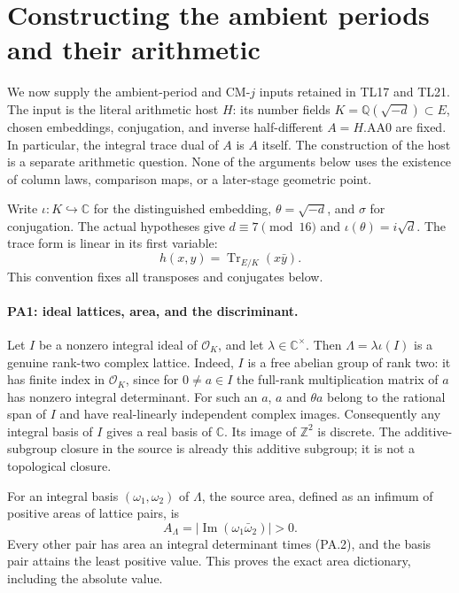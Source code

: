 \section{Constructing the ambient periods and their arithmetic}
\label{sec:period-arithmetic}

We now supply the ambient-period and CM-$j$ inputs retained in TL17
and TL21. The input is the literal arithmetic host $H$: its number
fields $K=\mathbb Q(\sqrt{-d})\subset E$, chosen embeddings, conjugation,
and inverse half-different $A=H.\mathrm{AA0}$ are fixed. In particular,
the integral trace dual of $A$ is $A$ itself. The construction of the
host is a separate arithmetic question. None of the arguments below
uses the existence of column laws, comparison maps, or a later-stage
geometric point.

Write $\iota:K\hookrightarrow\mathbb C$ for the distinguished embedding,
$\theta=\sqrt{-d}$, and $\sigma$ for conjugation. The actual hypotheses
give $d\equiv7\pmod {16}$ and $\iota(\theta)=i\sqrt d$.
The trace form is linear in its first variable:
\[
 h(x,y)=\operatorname{Tr}_{E/K}(x\bar y).
                                                               \tag{PA.1}
\]
This convention fixes all transposes and conjugates below.

\paragraph{PA1: ideal lattices, area, and the discriminant.}
Let $I$ be a nonzero integral ideal of $\mathcal O_K$, and let
$\lambda\in\mathbb C^\times$. Then
$\Lambda=\lambda\iota(I)$ is a genuine rank-two complex lattice.
Indeed, $I$ is a free abelian group of rank two: it has finite index
in $\mathcal O_K$, since for $0\ne a\in I$ the full-rank multiplication
matrix of $a$ has nonzero integral determinant. For such an $a$,
$a$ and $\theta a$ belong to the rational span of $I$ and have
real-linearly independent complex images. Consequently any integral
basis of $I$ gives a real basis of $\mathbb C$. Its image of
$\mathbb Z^2$ is discrete. The additive-subgroup closure in the source
is already this additive subgroup; it is not a topological closure.

For an integral basis $(\omega_1,\omega_2)$ of $\Lambda$, the source
area, defined as an infimum of positive areas of lattice pairs, is
\[
 A_\Lambda=|\operatorname{Im}(\omega_1\bar\omega_2)|>0.
                                                               \tag{PA.2}
\]
Every other pair has area an integral determinant times (PA.2),
and the basis pair attains the least positive value. This proves
the exact area dictionary, including the absolute value.

